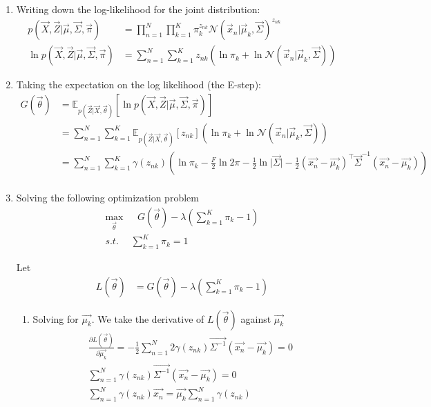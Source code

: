 \documentclass[12pt,twoside]{article}
\begin{document}
\begin{enumerate}
\item Writing down the log-likelihood for the joint distribution:
\begin{align*}
p(\vec{X}, \vec{Z}\vert \vec{\mu}, \vec{\Sigma}, \vec{\pi})& =\prod_{n=1}^{N}\prod_{k=1}^{K} \pi_k^{z_{nk}}\mathcal{N}(\vec{x}_n\vert \vec{\mu}_k, \vec{\Sigma})^{z_{nk}}\\
\ln p(\vec{X}, \vec{Z}\vert \vec{\mu}, \vec{\Sigma}, \vec{\pi})& =\sum_{n=1}^{N}\sum_{k=1}^{K} z_{nk}\left(\ln \pi_k + \ln \mathcal{N}(\vec{x}_n\vert \vec{\mu}_k, \vec{\Sigma})\right)
\end{align*}

\item Taking the expectation on the log likelihood (the E-step):
\begin{align*}
G(\vec{\theta})
& =\mathbb{E}_{p(\vec{Z}\vert \vec{X}, \vec{\theta})}\left[\ln p(\vec{X}, \vec{Z}\vert \vec{\mu}, \vec{\Sigma}, \vec{\pi})\right]\\
& =\sum_{n=1}^{N}\sum_{k=1}^{K} \mathbb{E}_{p(\vec{Z}\vert \vec{X}, \vec{\theta})}[z_{nk}]\left(\ln \pi_k + \ln \mathcal{N}(\vec{x}_n\vert \vec{\mu}_k, \vec{\Sigma})\right)\\
& =\sum_{n=1}^{N}\sum_{k=1}^{K} \gamma(z_{nk})\left(\ln \pi_k -\frac{F}{2}\ln 2\pi -\frac{1}{2}\ln\vert \vec{\Sigma} \vert - \frac{1}{2}(\vec{x_n}-\vec{\mu_k})^\top\vec{\Sigma}^{-1}(\vec{x_n}-\vec{\mu_k})\right)\\
\end{align*}

\item Solving the following optimization problem
\begin{align*}
\max_\vec{\theta} &\text{  } G(\vec{\theta}) -\lambda\left(\sum_{k=1}^K \pi_k -1\right)\\
\textit{s.t.} & \sum_{k=1}^K \pi_k =1
\end{align*}

Let
\begin{align*}
L(\vec{\theta}) & = G(\vec{\theta})-\lambda\left(\sum_{k=1}^K \pi_k -1\right)
\end{align*}

\begin{enumerate}
\item Solving for $\vec{\mu_k}$. We take the derivative of $L(\vec{\theta})$ against $\vec{\mu_k}$
\begin{align*}
\frac{\partial L(\vec{\theta})}{\partial \vec{\mu_k}}
= -\frac{1}{2} \sum_{n=1}^N 2\gamma(z_{nk})\vec{\Sigma^{-1}}(\vec{x_n}-\vec{\mu_k})
= 0\\
\sum_{n=1}^N \gamma(z_{nk})\vec{\Sigma^{-1}}(\vec{x_n}-\vec{\mu_k})=0\\
\sum_{n=1}^N \gamma(z_{nk})\vec{x_n}=\vec{\mu_k}\sum_{n=1}^N \gamma(z_{nk})
\end{align*}


\end{enumerate}
\end{enumerate}
\end{document}
